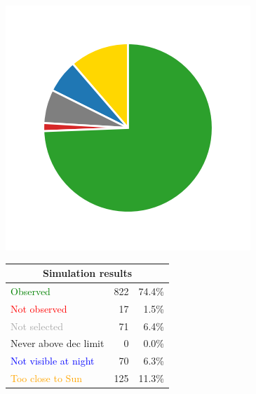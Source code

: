\begin{colsection}
\begin{colsection}
\begin{figure}[p]
    \begin{center}
        \begin{minipage}[t]{0.15\textwidth}\vspace{0.6cm}
            \includegraphics[trim={.5cm 0 .5cm 0},clip,width=\linewidth]{images/gw_sims/2n8&1s4_pie.png}
        \end{minipage}
        \begin{minipage}[t]{0.45\textwidth}\vspace{0pt}
            \begin{tabular}{lrr}
                \multicolumn{3}{c}{\textbf{Simulation results}} \\
                \midrule
                \textcolor{Green}{Observed} & 822 & 74.4\% \\
                \textcolor{Red}{Not observed} & 17 & 1.5\% \\
                \textcolor{darkgray}{Not selected} & 71 & 6.4\% \\
                \textcolor{NavyBlue}{Never above dec limit} & 0 & 0.0\% \\
                \textcolor{Blue}{Not visible at night} & 70 & 6.3\% \\
                \textcolor{Orange}{Too close to Sun} & 125 & 11.3\% \\

\end{tabular}
\end{minipage}
\end{center}
\end{figure}
\end{colsection}
\end{colsection}
